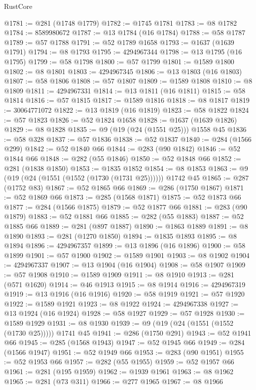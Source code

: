 \begin{lexlean}{RustCore}
\begin{coremodule}
@1781 := @281 (@1748 @1779)
@1782 := @1745 @1781
@1783 := @8 @1782
@1784 := 8589980672
@1787 := @13 @1784 (@16 @1784)
@1788 := @58 @1787
@1789 := @57 @1788
@1791 := @52 @1789 @1658
@1793 := @1637 (@1639 @1791)
@1794 := @8 @1793
@1795 := 4294967344
@1798 := @13 @1795 (@16 @1795)
@1799 := @58 @1798
@1800 := @57 @1799
@1801 := @1589 @1800
@1802 := @8 @1801
@1803 := 4294967345
@1806 := @13 @1803 (@16 @1803)
@1807 := @58 @1806
@1808 := @57 @1807
@1809 := @1589 @1808
@1810 := @8 @1809
@1811 := 4294967331
@1814 := @13 @1811 (@16 @1811)
@1815 := @58 @1814
@1816 := @57 @1815
@1817 := @1589 @1816
@1818 := @8 @1817
@1819 := 30064771072
@1822 := @13 @1819 (@16 @1819)
@1823 := @58 @1822
@1824 := @57 @1823
@1826 := @52 @1824 @1658
@1828 := @1637 (@1639 @1826)
@1829 := @8 @1828
@1835 := @9 (@19 (@24 (@1551 @25))) @1558 @45
@1836 := @58 @328
@1837 := @57 @1836
@1838 := @52 @1837
@1840 := @284 (@1566 @299)
@1842 := @52 @1840 @66
@1844 := @283 (@90 @1842)
@1846 := @52 @1844 @66
@1848 := @282 (@55 @1846)
@1850 := @52 @1848 @66
@1852 := @281 (@1838 @1850)
@1853 := @1835 @1852
@1854 := @8 @1853
@1863 := @9 (@19 (@24 (@1551 (@1552 (@1730 (@1731 @25)))))) @1742 @45
@1865 := @287 (@1752 @83)
@1867 := @52 @1865 @66
@1869 := @286 (@1750 @1867)
@1871 := @52 @1869 @66
@1873 := @285 (@1568 @1871)
@1875 := @52 @1873 @66
@1877 := @284 (@1566 @1875)
@1879 := @52 @1877 @66
@1881 := @283 (@90 @1879)
@1883 := @52 @1881 @66
@1885 := @282 (@55 @1883)
@1887 := @52 @1885 @66
@1889 := @281 (@897 @1887)
@1890 := @1863 @1889
@1891 := @8 @1890
@1893 := @281 (@1270 @1850)
@1894 := @1835 @1893
@1895 := @8 @1894
@1896 := 4294967357
@1899 := @13 @1896 (@16 @1896)
@1900 := @58 @1899
@1901 := @57 @1900
@1902 := @1589 @1901
@1903 := @8 @1902
@1904 := 4294967337
@1907 := @13 @1904 (@16 @1904)
@1908 := @58 @1907
@1909 := @57 @1908
@1910 := @1589 @1909
@1911 := @8 @1910
@1913 := @281 (@571 @1620)
@1914 := @46 @1913
@1915 := @8 @1914
@1916 := 4294967319
@1919 := @13 @1916 (@16 @1916)
@1920 := @58 @1919
@1921 := @57 @1920
@1922 := @1589 @1921
@1923 := @8 @1922
@1924 := 4294967338
@1927 := @13 @1924 (@16 @1924)
@1928 := @58 @1927
@1929 := @57 @1928
@1930 := @1589 @1929
@1931 := @8 @1930
@1939 := @9 (@19 (@24 (@1551 (@1552 (@1730 @25))))) @1741 @45
@1941 := @286 (@1750 @291)
@1943 := @52 @1941 @66
@1945 := @285 (@1568 @1943)
@1947 := @52 @1945 @66
@1949 := @284 (@1566 @1947)
@1951 := @52 @1949 @66
@1953 := @283 (@90 @1951)
@1955 := @52 @1953 @66
@1957 := @282 (@55 @1955)
@1959 := @52 @1957 @66
@1961 := @281 (@195 @1959)
@1962 := @1939 @1961
@1963 := @8 @1962
@1965 := @281 (@73 @311)
@1966 := @277 @1965
@1967 := @8 @1966

\end{coremodule}
\end{lexlean}

